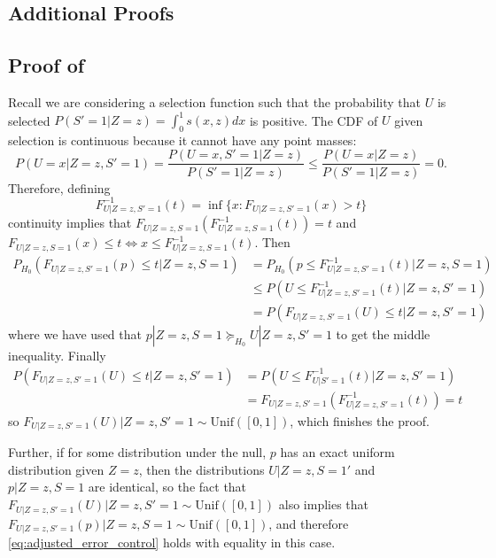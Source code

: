 \documentclass{article}
\begin{document}
\begin{appendix}
\section{Additional Proofs}
\label{sec:proofs_appdx}

\subsection{Proof of }
Recall we are considering a selection function such that the probability that $U$ is selected $P(S'=1 | Z= z) = \int_0^1 s(x, z) dx$ is positive. The CDF of $U$ given selection is continuous because it cannot have any point masses:
\begin{equation*}
    P(U = x | Z=z, S' = 1) = \frac{P(U = x, S' = 1| Z=z)}{P(S'=1 |Z=z)} \leq \frac{P(U = x|Z=z)}{P(S'=1|Z=z)} =  0. 
\end{equation*}
Therefore, defining 
\begin{equation*}
    F^{-1}_{U |Z=z, S'=1}(t)  = \inf \{x: F_{U |Z=z, S' = 1}(x) > t  \}
\end{equation*}
continuity implies that $F_{U|Z=z, S =1}(F^{-1}_{U |Z=z, S=1}(t)) = t$ and $F_{U | Z=z, S = 1}(x) \leq t \iff x \leq  F^{-1}_{U | Z=z, S = 1}(t)$. Then 
\begin{align*}
    P_{H_0}(F_{U | Z=z, S' = 1}(p) \leq  t |Z=z, S=1) &= P_{H_0}(p \leq F_{U |Z=z,  S' = 1}^{-1}(t) | Z=z, S=1) \\
    &\leq P(U \leq F_{U |Z=z, S' = 1}^{-1}(t) |Z=z, S'=1) \\
    &= P(F_{U|Z=z, S' = 1}(U) \leq t |Z=z, S'=1)
\end{align*}
where we have used that $p | Z=z, S=1 \succeq_{H_0} U |Z=z, S'=1$ to get the middle inequality. Finally 
\begin{align*}
    P(F_{U|Z=z, S' = 1}(U) \leq t |Z=z, S'=1) &= P(U \leq F_{U|S' = 1}^{-1}(t) | Z=z, S'=1) \\
    &= F_{U|Z=z, S'=1}(F_{U|Z=z, S' = 1}^{-1}(t)) = t
\end{align*}
so $F_{U|Z=z, S' = 1}(U) |Z=z, S' = 1 \sim \text{Unif}([0, 1])$, which finishes the proof. 

Further, if for some distribution under the null, $p$ has an exact uniform distribution given $Z=z$, then the distributions $U | Z = z, S= 1'$ and $p | Z= z , S=1$ are identical, so the fact that $F_{U|Z=z, S' = 1}(U) |Z=z, S' = 1 \sim \text{Unif}([0, 1])$ also implies that $F_{U|Z=z, S' = 1}(p) |Z=z, S = 1 \sim \text{Unif}([0, 1])$, and therefore \eqref{eq:adjusted_error_control} holds with equality in this case. 
 

\end{appendix}
\end{document}

